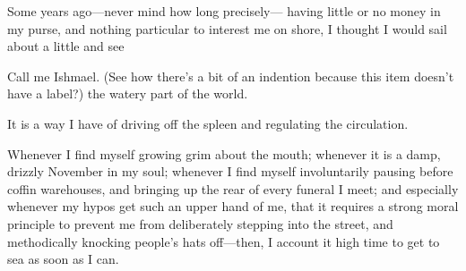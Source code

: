 \documentclass{article}
\begin{document}
\begin{description}
  \item[Label text] Some years ago---never mind how long precisely---
    having little or no money in my purse, and nothing particular to
    interest me on shore, I thought I would sail about a little and see
   \item Call me Ishmael. (See how there's a bit of an indention because this item doesn't have a label?)
   the watery part of the world.
  \item[Label text] It is a way I have of driving off the
    spleen and regulating the circulation.
  \item[Label text that is long] Whenever I find myself growing grim about the mouth; whenever it is a damp, drizzly
    November in my soul; whenever I find myself involuntarily pausing
    before coffin warehouses, and bringing up the rear of every funeral
    I meet; and especially whenever my hypos get such an upper hand of me,
    that it requires a strong moral principle to prevent me from
    deliberately stepping into the street, and methodically knocking
    people's hats off---then, I account it high time to get to sea as
    soon as I can.
\end{description}
\end{document}
